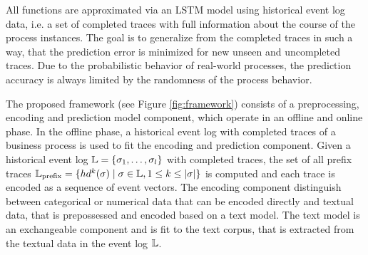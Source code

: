 All functions are approximated via an LSTM model using historical event log data, i.e. a set of completed traces with full information about the course of the process instances.
The goal is to generalize from the completed traces in such a way, that the prediction error is minimized for new unseen and uncompleted traces.
Due to the probabilistic behavior of real-world processes, the prediction accuracy is always limited by the randomness of the process behavior.

The proposed framework (see Figure \ref{fig:framework}) consists of a preprocessing, encoding and prediction model component, which operate in an offline and online phase.
In the offline phase, a historical event log with completed traces of a business process is used to fit the encoding and prediction component.
Given a historical event log $\mathbb{L} = \{\sigma_1, \dots, \sigma_l\}$ with completed traces, the set of all prefix traces $\mathbb{L}_\mathrm{prefix} = \{ hd^k(\sigma) \mid  \sigma \in \mathbb{L}, 1 \leq k \leq |\sigma|\}$ is computed and each trace is encoded as a sequence of event vectors.
The encoding component distinguish between categorical or numerical data that can be encoded directly and textual data, that is prepossessed and encoded based on a text model.
The text model is an exchangeable component and is fit to the text corpus, that is extracted from the textual data in the event log $\mathbb{L}$.


